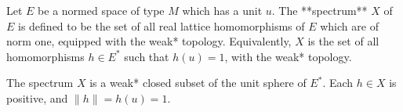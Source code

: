 Let $E$ be a normed space of type $M$ which has a unit $u$. The **spectrum** $X$ of $E$ is defined to be the set of all real lattice homomorphisms of $E$ which are of norm one, equipped with the weak* topology. Equivalently, $X$ is the set of all homomorphisms $h \in E^*$ such that $h(u) = 1$, with the weak* topology.

The spectrum $X$ is a weak* closed subset of the unit sphere of $E^*$. Each $h \in X$ is positive, and $\|h\| = h(u) = 1$.

